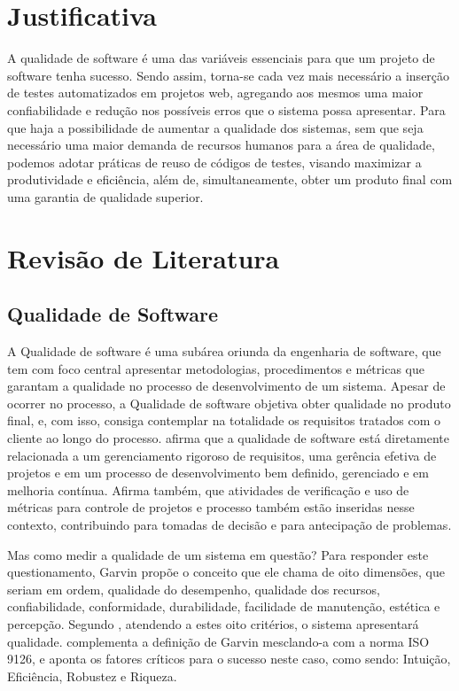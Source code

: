 \documentclass[12pt]{article}
\begin{document}
	\section{Justificativa}
	
	A qualidade de software  é uma das variáveis essenciais para que um projeto de software tenha sucesso.
	Sendo assim, torna-se cada vez mais necessário a inserção de testes automatizados em projetos web,
	agregando aos mesmos uma maior confiabilidade e redução nos possíveis erros que o sistema possa
	apresentar. Para que haja a possibilidade de aumentar a qualidade dos sistemas, sem que seja necessário uma maior
	demanda de recursos humanos para a área de qualidade, podemos adotar práticas de reuso de códigos de testes, visando
	maximizar a produtividade e eficiência, além de, simultaneamente, obter um produto final com uma garantia de qualidade
	superior.
	
	\section{Revisão de Literatura}
	
	\subsection{Qualidade de Software}
	
	A Qualidade de software é uma subárea oriunda da engenharia de software, que tem com foco central apresentar metodologias,
	procedimentos e métricas que garantam a qualidade no processo de desenvolvimento de um sistema. Apesar de ocorrer no processo, a Qualidade de software
	objetiva obter qualidade no produto final, e, com isso, consiga contemplar na totalidade os requisitos tratados com o cliente ao longo do processo.
    \citeauthor{de2006introduccao} \cite{de2006introduccao} afirma que a qualidade de software está diretamente relacionada a um gerenciamento
    rigoroso de requisitos, uma gerência efetiva de projetos e em um processo de desenvolvimento bem definido, gerenciado e em melhoria contínua. Afirma também,
    que atividades de verificação e uso de métricas para controle de projetos e processo também estão inseridas nesse contexto, contribuindo para tomadas de
    decisão e para antecipação de problemas.

    Mas como medir a qualidade de um sistema em questão? Para responder este questionamento, Garvin \cite{garvin1987competing} propõe o conceito que ele chama de
    oito dimensões, que seriam em ordem, qualidade do desempenho, qualidade dos recursos, confiabilidade, conformidade, durabilidade, facilidade de manutenção,
    estética e percepção. Segundo \citeauthor{garvin1987competing}, atendendo a estes oito critérios, o sistema apresentará qualidade.
    \citeauthor{pressman2011engenharia} \cite{pressman2011engenharia} complementa a definição de Garvin mesclando-a com a norma ISO 9126, e aponta os fatores
    críticos para o sucesso neste caso, como sendo: Intuição, Eficiência, Robustez e Riqueza.
\end{document}

